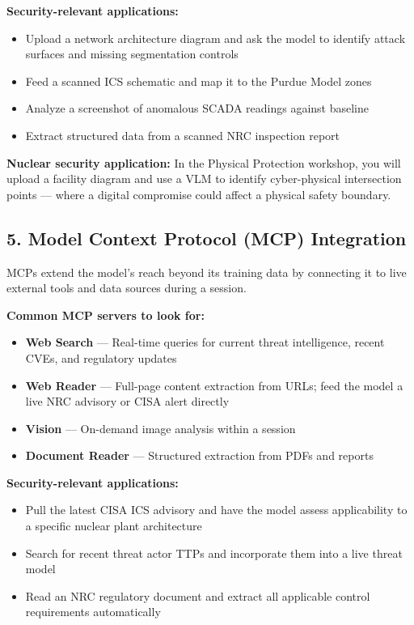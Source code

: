 \documentclass[9pt]{extarticle}
\begin{document}
\textbf{Security-relevant applications:}
\begin{itemize}
    \item Upload a network architecture diagram and ask the model to identify
          attack surfaces and missing segmentation controls
    \item Feed a scanned ICS schematic and map it to the Purdue Model zones
    \item Analyze a screenshot of anomalous SCADA readings against baseline
    \item Extract structured data from a scanned NRC inspection report
\end{itemize}

\textbf{Nuclear security application:} In the Physical Protection workshop, you will
upload a facility diagram and use a VLM to identify cyber-physical intersection
points --- where a digital compromise could affect a physical safety boundary.

\subsection*{5. Model Context Protocol (MCP) Integration}

MCPs extend the model's reach beyond its training data by connecting it to live
external tools and data sources during a session.

\medskip

\textbf{Common MCP servers to look for:}
\begin{itemize}
    \item \textbf{Web Search} --- Real-time queries for current threat intelligence,
          recent CVEs, and regulatory updates
    \item \textbf{Web Reader} --- Full-page content extraction from URLs; feed the
          model a live NRC advisory or CISA alert directly
    \item \textbf{Vision} --- On-demand image analysis within a session
    \item \textbf{Document Reader} --- Structured extraction from PDFs and reports
\end{itemize}

\textbf{Security-relevant applications:}
\begin{itemize}
    \item Pull the latest CISA ICS advisory and have the model assess applicability
          to a specific nuclear plant architecture
    \item Search for recent threat actor TTPs and incorporate them into a live
          threat model
    \item Read an NRC regulatory document and extract all applicable control
          requirements automatically
\end{itemize}
\end{document}
